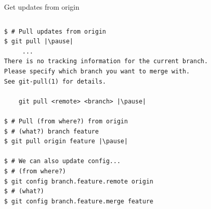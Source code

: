 \begin{frame}[fragile]{Get updates from origin}
\begin{columns}
	\begin{column}{0.4\textwidth}
	\begin{lstlisting}
$ # Pull updates from origin
$ git pull |\pause|
     ...
There is no tracking information for the current branch.
Please specify which branch you want to merge with.
See git-pull(1) for details.

    git pull <remote> <branch> |\pause|
    
$ # Pull (from where?) from origin
$ # (what?) branch feature 
$ git pull origin feature |\pause|

$ # We can also update config...
$ # (from where?)
$ git config branch.feature.remote origin
$ # (what?)
$ git config branch.feature.merge feature


\end{lstlisting}
\end{column}
\end{columns}
\end{frame}
